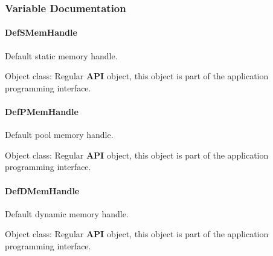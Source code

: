 \subsubsection{Variable Documentation}
\hypertarget{group__mem__impl_ga59214c7e13470c5e76c7b59c4f084b1c}{
\paragraph[{Def\-S\-Mem\-Handle}]{ Def\-S\-Mem\-Handle}}\label{group__mem__impl_ga59214c7e13470c5e76c7b59c4f084b1c}


Default static memory handle. 

\begin{DoxyParagraph}{Object class\-:}
Regular {\bfseries A\-P\-I} object, this object is part of the application programming interface. 
\end{DoxyParagraph}
\hypertarget{group__mem__impl_gafb0dc701e9679157a617a091843bcd7f}{
\paragraph[{Def\-P\-Mem\-Handle}]{ Def\-P\-Mem\-Handle}}\label{group__mem__impl_gafb0dc701e9679157a617a091843bcd7f}


Default pool memory handle. 

\begin{DoxyParagraph}{Object class\-:}
Regular {\bfseries A\-P\-I} object, this object is part of the application programming interface. 
\end{DoxyParagraph}
\hypertarget{group__mem__impl_gae2d3f8ca3b99ba0a5b9d9518a7bc280b}{
\paragraph[{Def\-D\-Mem\-Handle}]{ Def\-D\-Mem\-Handle}}\label{group__mem__impl_gae2d3f8ca3b99ba0a5b9d9518a7bc280b}


Default dynamic memory handle. 

\begin{DoxyParagraph}{Object class\-:}
Regular {\bfseries A\-P\-I} object, this object is part of the application programming interface. 
\end{DoxyParagraph}

